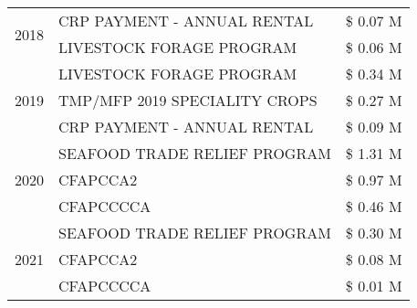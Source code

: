 \begin{tabular}{llr}
\cline{1-3}
\multirow[t]{2}{*}{2018} & CRP PAYMENT - ANNUAL RENTAL & \$ 0.07 M \\
 & LIVESTOCK FORAGE PROGRAM & \$ 0.06 M \\
\cline{1-3}
\multirow[t]{3}{*}{2019} & LIVESTOCK FORAGE PROGRAM & \$ 0.34 M \\
 & TMP/MFP 2019 SPECIALITY CROPS & \$ 0.27 M \\
 & CRP PAYMENT - ANNUAL RENTAL & \$ 0.09 M \\
\cline{1-3}
\multirow[t]{3}{*}{2020} & SEAFOOD TRADE RELIEF PROGRAM & \$ 1.31 M \\
 & CFAPCCA2 & \$ 0.97 M \\
 & CFAPCCCCA & \$ 0.46 M \\
\cline{1-3}
\multirow[t]{3}{*}{2021} & SEAFOOD TRADE RELIEF PROGRAM & \$ 0.30 M \\
 & CFAPCCA2 & \$ 0.08 M \\
 & CFAPCCCCA & \$ 0.01 M \\
\cline{1-3}
\bottomrule
\end{tabular}
